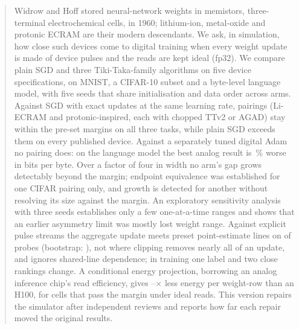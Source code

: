 \begin{abstract}
Widrow and Hoff stored neural-network weights in memistors, three-terminal electrochemical cells, in 1960; lithium-ion,
metal-oxide and protonic ECRAM are their modern descendants. We ask, in simulation, how close such devices come to digital
training when every weight update is made of device pulses and the reads are kept ideal (fp32). We compare plain SGD and three
Tiki-Taka-family algorithms on five device specifications, on MNIST, a CIFAR-10 subset and a byte-level language model, with five
seeds that share initialisation and data order across arms. Against SGD with exact updates at the same learning rate,
\RVAllThreeFpN{} pairings (Li-ECRAM and protonic-inspired, each with chopped TTv2 or AGAD) stay within the pre-set margins on all
three tasks, while plain SGD exceeds them on every published device. Against a separately tuned digital Adam no pairing does: on
the language model the best analog result is \RVLmAdamBestGap\,\% worse in bits per byte. Over a factor of four in width no
arm's gap grows detectably beyond the margin; endpoint equivalence was established for one CIFAR pairing only, and growth is detected for another without resolving its size against the margin. An exploratory sensitivity analysis with three seeds establishes only a few one-at-a-time
ranges and shows that an earlier asymmetry limit was mostly lost weight range. Against explicit pulse streams the aggregate
update meets preset point-estimate lines on \RYProbeSurMeetsN{} of \RYProbeN{} probes (bootstrap:
\RYProbeSurAtNinetyFiveN), not where clipping removes nearly all of an
update, and ignores shared-line dependence; in training one label and two close rankings change. A conditional energy projection, borrowing an analog inference chip's read efficiency, gives
\RVenSysMin--\RVenChipMax$\times$ less energy per weight-row than an H100, for cells that pass the margin under ideal reads. This
version repairs the simulator after independent reviews and reports how far each repair moved the original results.
\end{abstract}
